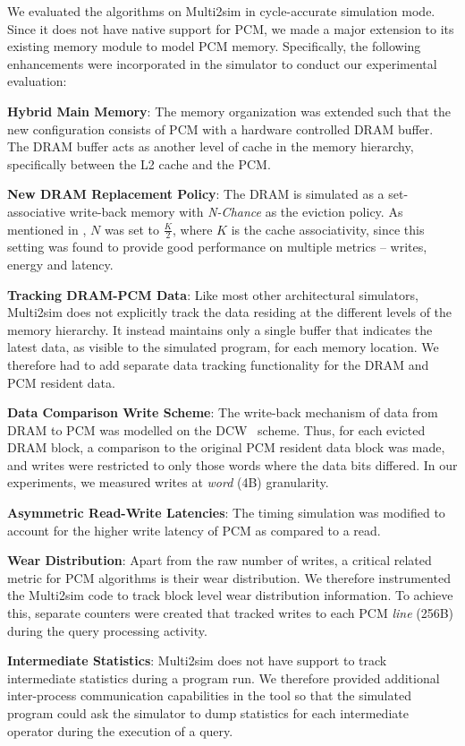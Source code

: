 We evaluated the algorithms on Multi2sim in cycle-accurate simulation
mode. Since it does not have native support for PCM, we made a major
extension to its existing memory module to model PCM memory. Specifically,
the following enhancements were incorporated in the simulator to conduct
our experimental evaluation:

\textbf{Hybrid Main Memory}: 
The memory organization was extended such that the new configuration
consists of PCM with a hardware controlled DRAM buffer. The DRAM buffer
acts as another level of cache in the memory hierarchy, specifically
between the L2 cache and the PCM.

\textbf{New DRAM Replacement Policy}: 
The DRAM is simulated as a set-associative write-back memory with
\textit{N-Chance} as the eviction policy. As mentioned in \cite{nchance},
$N$ was set to $\frac{K}{2}$, where $K$ is the cache associativity,
since this setting was found to provide good performance on multiple
metrics -- writes, energy and latency.

\textbf{Tracking DRAM-PCM Data}:
Like most other architectural simulators, Multi2sim does not explicitly
track the data residing at the different levels of the memory
hierarchy. It instead maintains only a single buffer that indicates
the latest data, as visible to the simulated program, for each memory
location. We therefore had to add separate data tracking functionality
for the DRAM and PCM resident data.

\textbf{Data Comparison Write Scheme}: 
The write-back mechanism of data from DRAM to PCM was modelled on the
DCW~\cite{write} scheme. Thus, for each evicted DRAM block, a comparison
to the original PCM resident data block was made, and writes were
restricted to only those words where the data bits differed. In our
experiments, we measured writes at \textit{word} (4B) granularity.

\textbf{Asymmetric Read-Write Latencies}:  
The timing simulation was modified to account for the higher write
latency of PCM as compared to a read.

\textbf{Wear Distribution}: 
Apart from the raw number of writes, a critical related metric for PCM
algorithms is their wear distribution. We therefore instrumented the
Multi2sim code to track block level wear distribution information. To
achieve this, separate counters were created that tracked writes to each
PCM \textit{line} (256B) during the query processing activity.

\textbf{Intermediate Statistics}: 
Multi2sim does not have support to track intermediate statistics during
a program run. We therefore provided additional inter-process communication capabilities in the
tool so that the simulated program could ask the simulator to dump
statistics for each intermediate operator during the execution of a query.


